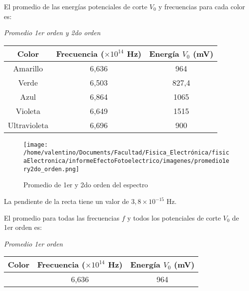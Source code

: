 \documentclass[a4paper]{article}
\begin{document}
      \indent El promedio de las energías potenciales de corte $V_{0}$ y frecuencias para cada color es:\\
      \begin{minipage}[c]{7.5cm}
        \vspace{5mm}
        \centering
        \textit{Promedio 1er orden y 2do orden}  
        \vspace{2mm}
      \end{minipage}

      \begin{tabular}{ c c c }
        \toprule
        Color & Frecuencia ($\times 10^{14}$ Hz) & Energía $V_{0}$ (mV) \\
          \midrule
          Amarillo      & 6,636 & 964   \\
          Verde         & 6,503 & 827,4 \\
          Azul          & 6,864 & 1065  \\
          Violeta       & 6,649 & 1515  \\
          Ultravioleta  & 6,696 & 900   \\
        \bottomrule
      \end{tabular}
      \vspace{5mm}

      \begin{figure}[h]
        \centering
        \texttt{[image: /home/valentino/Documents/Facultad/Fisica\_Electrónica/fisicaElectronica/informeEfectoFotoelectrico/imagenes/promedio1ery2do\_orden.png]}
        \caption{\small Promedio de 1er y 2do orden del espectro}
      \end{figure}
      \vspace{5mm}

      \indent La pendiente de la recta tiene un valor de $3,8 \times 10^{-15}$ Hz.
      \vspace{5mm}

      \indent El promedio para todas las frecuencias $f$ y todos los potenciales de corte $V_{0}$ de 1er orden es:
      \vspace{5mm}

      \begin{minipage}[c]{7.5cm}
        \vspace{5mm}
        \centering
        \textit{Promedio 1er orden} 
        \vspace{2mm}
      \end{minipage}

      \begin{tabular}{ c c c }
        \toprule
        Color & Frecuencia ($\times 10^{14}$ Hz) & Energía $V_{0}$ (mV) \\
          \midrule
          & 6,636 & 964 \\
        \bottomrule
      \end{tabular}
      \vspace{5mm}
\end{document}
